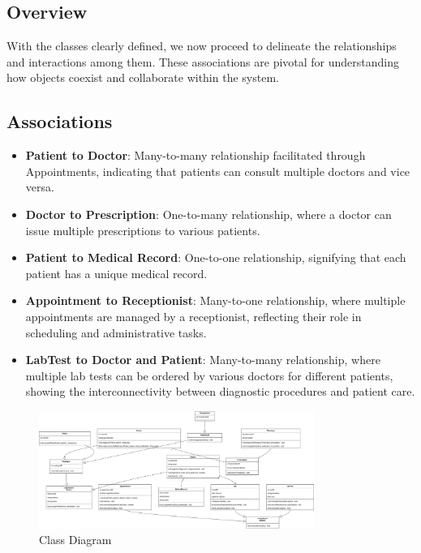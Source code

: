 \documentclass[12pt]{article}
\begin{document}
\subsection*{Overview}
With the classes clearly defined, we now proceed to delineate the relationships and interactions among them. These associations are pivotal for understanding how objects coexist and collaborate within the system.

\subsection*{Associations}
\begin{itemize}
  \item \textbf{Patient to Doctor}: Many-to-many relationship facilitated through Appointments, indicating that patients can consult multiple doctors and vice versa.
  \item \textbf{Doctor to Prescription}: One-to-many relationship, where a doctor can issue multiple prescriptions to various patients.
  \item \textbf{Patient to Medical Record}: One-to-one relationship, signifying that each patient has a unique medical record.
  \item \textbf{Appointment to Receptionist}: Many-to-one relationship, where multiple appointments are managed by a receptionist, reflecting their role in scheduling and administrative tasks.
  \item \textbf{LabTest to Doctor and Patient}: Many-to-many relationship, where multiple lab tests can be ordered by various doctors for different patients, showing the interconnectivity between diagnostic procedures and patient care.
\end{itemize}

\begin{figure}[h]
  \centering
  \includegraphics[width=0.8\textwidth]{1.png} %
  \caption{Class Diagram}
  \label{fig:diagram1}
\end{figure}
\end{document}
